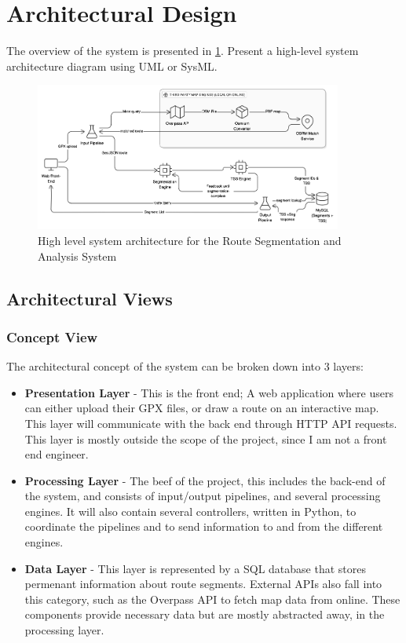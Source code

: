 \documentclass[11pt,twoside]{report}
\begin{document}
\section{Architectural Design}
The overview of the system is presented in \ref{fig:archdiagram}.
Present a high-level system architecture diagram using UML or SysML.

\begin{figure}[htbp!]
	\centering
	\includegraphics[width=0.9\textwidth]{archdiagram.png}
	\caption {High level system architecture for the Route Segmentation and Analysis System}
	\label{fig:archdiagram}
\end{figure}

\subsection{Architectural Views}
\subsubsection{Concept View}
The architectural concept of the system can be broken down into 3 layers:
\begin{itemize}
	\item \textbf{Presentation Layer} - This is the front end; A web application where users can either upload their GPX
	      files, or draw a route on an interactive map. This layer will communicate with the back end through HTTP API requests. This layer is mostly
	      outside the scope of the project, since I am not a front end engineer.
	\item \textbf{Processing Layer} - The beef of the project, this includes the back-end of the system, and consists of input/output pipelines,
	      and several processing engines. It will also contain several controllers, written in Python, to coordinate the pipelines and to send
	      information to and from the different engines.
	\item \textbf{Data Layer} - This layer is represented by a SQL database that stores permenant information about route segments. External APIs also
	      fall into this category, such as the Overpass API \citep{OverpassAPI} to fetch map data from online. These components provide necessary data but are mostly abstracted
	      away, in the processing layer.
\end{itemize}
\end{document}

